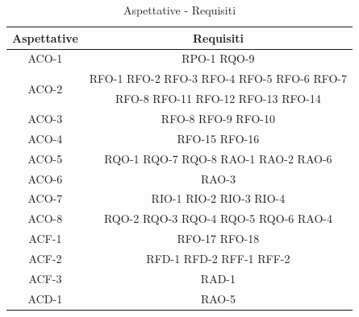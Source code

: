 \newpage

\begin{table}[h]
\begin{center}
     \begin{tabular}
           {@{\extracolsep{\fill}}|c|c|}
     \hline
      \textbf{Aspettative} & \textbf{Requisiti} \\
     \hline
     ACO-1 & RPO-1 RQO-9 \\
     \hline
     \multirow{2}{*}{ACO-2} & RFO-1 RFO-2 RFO-3 RFO-4 RFO-5 RFO-6 RFO-7 \\ & RFO-8 RFO-11 RFO-12 RFO-13 RFO-14 \\
     \hline
     ACO-3  & RFO-8  RFO-9 RFO-10 \\
     \hline
     ACO-4  & RFO-15 RFO-16 \\
     \hline
     ACO-5  & RQO-1 RQO-7 RQO-8 RAO-1 RAO-2 RAO-6 \\
     \hline
     ACO-6  & RAO-3 \\
      \hline
     ACO-7  & RIO-1 RIO-2 RIO-3 RIO-4 \\
     \hline
     ACO-8  & RQO-2 RQO-3 RQO-4 RQO-5 RQO-6 RAO-4 \\
     \hline
     ACF-1  & RFO-17 RFO-18 \\
     \hline
     ACF-2 & RFD-1 RFD-2 RFF-1 RFF-2 \\
     \hline
     ACF-3  & RAD-1 \\
     \hline
     ACD-1 & RAO-5 \\
     
    \hline %
    \end{tabular}
  \caption{Aspettative - Requisiti} %
  \label{tab:aspreq}
  \end{center}
\end{table}

\newpage

